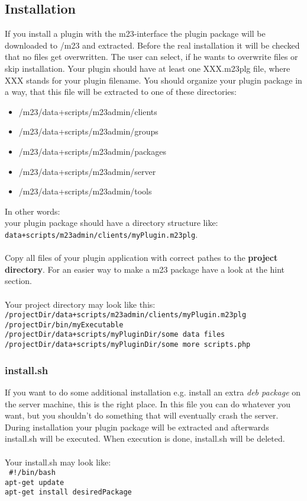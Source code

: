 \subsection{Installation}
If you install a plugin with the m23-interface the plugin package will be downloaded to /m23 and extracted. Before the real installation it will be checked that no files get overwritten. The user can select, if he wants to overwrite files or skip installation. Your plugin should have at least one XXX.m23plg file, where XXX stands for your plugin filename. You should organize your plugin package in a way, that this file will be extracted to one of these directories:
\begin{itemize}
\item /m23/data+scripts/m23admin/clients
\item /m23/data+scripts/m23admin/groups
\item /m23/data+scripts/m23admin/packages
\item /m23/data+scripts/m23admin/server
\item /m23/data+scripts/m23admin/tools
\end{itemize}
In other words:\\
your plugin package should have a directory structure like:\\ 

\texttt{data+scripts/m23admin/clients/myPlugin.m23plg}.\\\\
Copy all files of your plugin application with correct pathes to the \textbf{project directory}. For an easier way to make a m23 package have a look at the hint section.\\\\
Your project directory may look like this:\\
\texttt{/projectDir/data+scripts/m23admin/clients/myPlugin.m23plg\\
/projectDir/bin/myExecutable\\
/projectDir/data+scripts/myPluginDir/some data files\\
/projectDir/data+scripts/myPluginDir/some more scripts.php}

\subsubsection{install.sh}
If you want to do some additional installation e.g. install an extra \textit{deb package} on the server machine, this is the right place. In this file you can do whatever you want, but you shouldn't do something that will eventually crash the server.\\
During installation your plugin package will be extracted and afterwards install.sh will be executed. When execution is done, install.sh will be deleted.\\\\
Your install.sh may look like:\\
\texttt{
\#!/bin/bash \\
apt-get update\\
apt-get install desiredPackage}

